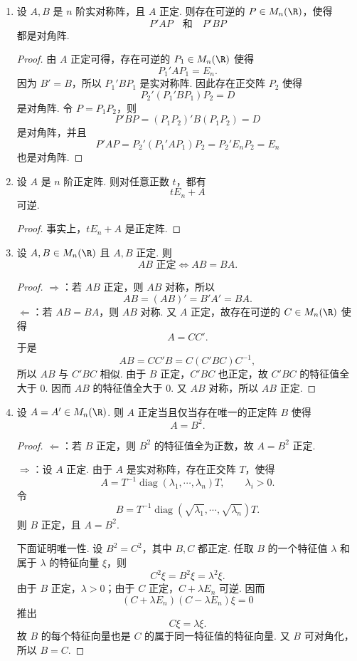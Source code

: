\begin{example}
	\begin{enumerate}
		\item 设 $A,B$ 是 $n$ 阶实对称阵，且 $A$ 正定. 则存在可逆的 $P\in M_n(\R)$，使得
		\[
		P'AP\quad\text{和}\quad P'BP
		\]
		都是对角阵.
		\begin{proof}
			由 $A$ 正定可得，存在可逆的 $P_1\in M_n(\R)$ 使得
			\[
			P_1'AP_1=E_n.
			\]
			因为 $B'=B$，所以 $P_1'BP_1$ 是实对称阵. 因此存在正交阵 $P_2$ 使得
			\[
			P_2'(P_1'BP_1)P_2=D
			\]
			是对角阵. 令 $P=P_1P_2$，则
			\[
			P'BP=(P_1P_2)'B(P_1P_2)=D
			\]
			是对角阵，并且
			\[
			P'AP=P_2'(P_1'AP_1)P_2=P_2'E_nP_2=E_n
			\]
			也是对角阵.
		\end{proof}
		\item 设 $A$ 是 $n$ 阶正定阵. 则对任意正数 $t$，都有
		\[
		tE_n+A
		\]
		可逆.\begin{proof}
			事实上，$tE_n+A$ 是正定阵.
		\end{proof}
		\item 设 $A,B\in M_n(\R)$ 且 $A,B$ 正定. 则
		\[
		AB\text{ 正定}\Longleftrightarrow AB=BA.
		\]
		
		\begin{proof}
			$\Rightarrow$：若 $AB$ 正定，则 $AB$ 对称，所以
			\[
			AB=(AB)'=B'A'=BA.
			\]
			$\Leftarrow$：若 $AB=BA$，则 $AB$ 对称. 又 $A$ 正定，故存在可逆的 $C\in M_n(\R)$ 使得
			\[
			A=CC'.
			\]
			于是
			\[
			AB=CC'B=C(C'BC)C^{-1},
			\]
			所以 $AB$ 与 $C'BC$ 相似. 由于 $B$ 正定，$C'BC$ 也正定，故 $C'BC$ 的特征值全大于 $0$. 因而 $AB$ 的特征值全大于 $0$. 又 $AB$ 对称，所以 $AB$ 正定.
		\end{proof}
		\item 设 $A=A'\in M_n(\R)$. 则 $A$ 正定当且仅当存在唯一的正定阵 $B$ 使得
		\[
		A=B^2.
		\]
		\begin{proof}
			$\Leftarrow$：若 $B$ 正定，则 $B^2$ 的特征值全为正数，故 $A=B^2$ 正定.
			
			$\Rightarrow$：设 $A$ 正定. 由于 $A$ 是实对称阵，存在正交阵 $T$，使得
			\[
			A=T^{-1}\operatorname{diag}(\lambda_1,\cdots,\lambda_n)T,
			\qquad \lambda_i>0.
			\]
			令
			\[
			B=T^{-1}\operatorname{diag}(\sqrt{\lambda_1},\cdots,\sqrt{\lambda_n})T.
			\]
			则 $B$ 正定，且 $A=B^2$.
			
			下面证明唯一性. 设 $B^2=C^2$，其中 $B,C$ 都正定. 任取 $B$ 的一个特征值 $\lambda$ 和属于 $\lambda$ 的特征向量 $\xi$，则
			\[
			C^2\xi=B^2\xi=\lambda^2\xi.
			\]
			由于 $B$ 正定，$\lambda>0$；由于 $C$ 正定，$C+\lambda E_n$ 可逆. 因而
			\[
			(C+\lambda E_n)(C-\lambda E_n)\xi=0
			\]
			推出
			\[
			C\xi=\lambda\xi.
			\]
			故 $B$ 的每个特征向量也是 $C$ 的属于同一特征值的特征向量. 又 $B$ 可对角化，所以 $B=C$.
		\end{proof}
		
	\end{enumerate}
\end{example}

